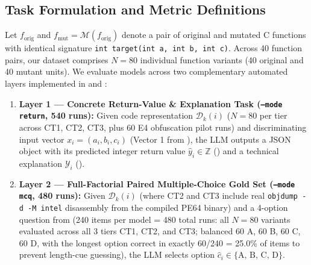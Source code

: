 \documentclass[runningheads]{llncs}
\begin{document}
\subsection{Task Formulation and Metric Definitions}
Let $f_{\text{orig}}$ and $f_{\text{mut}} = \mathcal{M}(f_{\text{orig}})$ denote a pair of original and mutated C functions with identical signature \texttt{int target(int a, int b, int c)}. Across 40 function pairs, our dataset comprises $N = 80$ individual function variants (40 original and 40 mutant units). We evaluate models across two complementary automated layers implemented in  and :
\begin{enumerate}
    \item \textbf{Layer 1 --- Concrete Return-Value \& Explanation Task (\texttt{--mode return}, 540 runs):} Given code representation $\mathcal{D}_k(i)$ ($N=80$ per tier across CT1, CT2, CT3, plus 60 E4 obfuscation pilot runs) and discriminating input vector $x_i = (a_i, b_i, c_i)$ (Vector 1 from ), the LLM outputs a JSON object with its predicted integer return value $\hat{y}_i \in \mathbb{Z}$ () and a technical explanation $\mathcal{Y}_i$ ().
    \item \textbf{Layer 2 --- Full-Factorial Paired Multiple-Choice Gold Set (\texttt{--mode mcq}, 480 runs):} Given $\mathcal{D}_k(i)$ (where CT2 and CT3 include real \texttt{objdump -d -M intel} disassembly from the compiled PE64 binary) and a 4-option question from  (240 items per model = 480 total runs: all $N=80$ variants evaluated across all 3 tiers CT1, CT2, and CT3; balanced 60 A, 60 B, 60 C, 60 D, with the longest option correct in exactly 60/240 = 25.0\% of items to prevent length-cue guessing), the LLM selects option $\hat{c}_i \in \{\text{A, B, C, D}\}$.
\end{enumerate}
\end{document}
